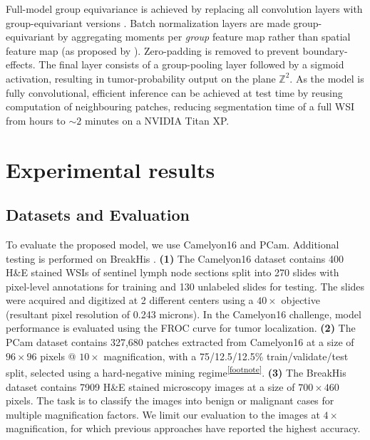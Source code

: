 \documentclass{llncs}
\begin{document}
Full-model group equivariance is achieved by replacing all convolution layers with group-equivariant versions \cite{Cohen2016-do}. Batch normalization layers\cite{Ioffe2015-ib} are made group-equivariant by aggregating moments per \textit{group} feature map rather than spatial feature map (as proposed by \cite{Cohen2016-do}). Zero-padding is removed to prevent boundary-effects. The final layer consists of a group-pooling layer followed by a sigmoid activation, resulting in tumor-probability output on the plane $\mathbb{Z}^2$. As the model is fully convolutional, efficient inference can be achieved at test time by reusing computation of neighbouring patches, reducing segmentation time of a full WSI from hours to $\sim2$ minutes on a NVIDIA Titan XP.

\section{Experimental results}
\subsection{Datasets and Evaluation}\label{ssec:data_eval}
To evaluate the proposed model, we use Camelyon16 \cite{Ehteshami_Bejnordi2017-pt} and PCam. Additional testing is performed on BreakHis \cite{Spanhol2016-dm}. \textbf{(1)} The Camelyon16  dataset contains 400 H\&E stained WSIs of sentinel lymph node sections split into 270 slides with pixel-level annotations for training and 130  unlabeled slides for testing.  The slides were acquired and digitized at 2 different centers  using a $40\times$ objective (resultant pixel resolution of 0.243 microns). In the Camelyon16 challenge, model performance is evaluated using the FROC curve for tumor localization. \textbf{(2)}  The PCam dataset contains 327,680 patches extracted from Camelyon16 at a size of $96\times96$ pixels @ $10\times$ magnification, with a 75/12.5/12.5\% train/validate/test split, selected using a hard-negative mining regime\textsuperscript{\ref{footnote}}.
\textbf{(3)} The BreakHis dataset contains 7909 H\&E stained microscopy images at a size of $700 \times 460$ pixels.  The task is to classify the images into benign or malignant cases for multiple magnification factors. We limit our evaluation to the images at $4\times$ magnification, for which previous approaches \cite{Spanhol2016-dm,Songyang} have reported the highest accuracy.
\end{document}
